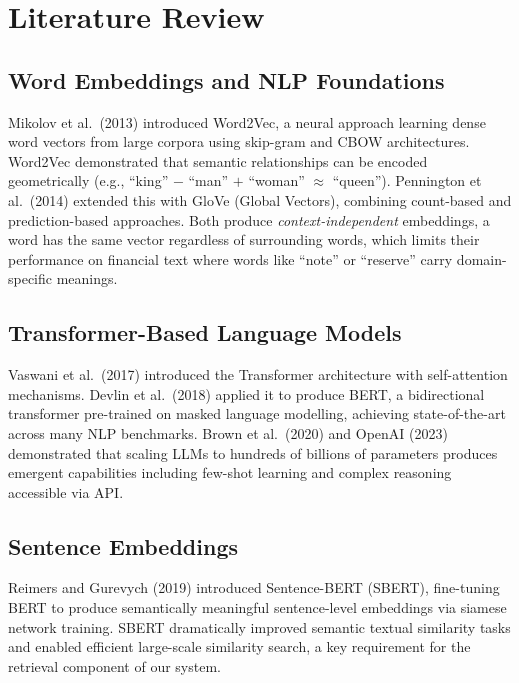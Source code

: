 \documentclass[12pt,a4paper]{article}
\begin{document}
\section{Literature Review}

\subsection{Word Embeddings and NLP Foundations}

Mikolov et al.\ (2013) introduced Word2Vec, a neural approach learning dense word vectors from large corpora using skip-gram and CBOW architectures. Word2Vec demonstrated that semantic relationships can be encoded geometrically (e.g., ``king'' $-$ ``man'' $+$ ``woman'' $\approx$ ``queen''). Pennington et al.\ (2014) extended this with GloVe (Global Vectors), combining count-based and prediction-based approaches. Both produce \textit{context-independent} embeddings, a word has the same vector regardless of surrounding words, which limits their performance on financial text where words like ``note'' or ``reserve'' carry domain-specific meanings.

\subsection{Transformer-Based Language Models}

Vaswani et al.\ (2017) introduced the Transformer architecture with self-attention mechanisms. Devlin et al.\ (2018) applied it to produce BERT, a bidirectional transformer pre-trained on masked language modelling, achieving state-of-the-art across many NLP benchmarks. Brown et al.\ (2020) and OpenAI (2023) demonstrated that scaling LLMs to hundreds of billions of parameters produces emergent capabilities including few-shot learning and complex reasoning accessible via API.

\subsection{Sentence Embeddings}

Reimers and Gurevych (2019) introduced Sentence-BERT (SBERT), fine-tuning BERT to produce semantically meaningful sentence-level embeddings via siamese network training. SBERT dramatically improved semantic textual similarity tasks and enabled efficient large-scale similarity search, a key requirement for the retrieval component of our system.
\end{document}
